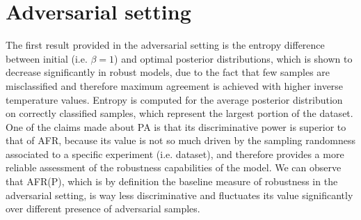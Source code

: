 \section{Adversarial setting}\label{sec:appendix_results_adversarial}

The first result provided in the adversarial setting is the entropy difference
between initial (i.e. $\beta=1$) and optimal posterior distributions, which is shown
to decrease significantly in robust models, due to the fact that few samples
are misclassified and therefore maximum agreement is achieved with higher
inverse temperature values. Entropy is computed for the average posterior distribution
on correctly classified samples, which represent the largest portion of the dataset. \\

One of the claims made about PA is that its discriminative power is superior to that
of AFR, because its value is not so much driven by the sampling randomness associated
to a specific experiment (i.e. dataset), and therefore provides a more reliable
assessment of the robustness capabilities of the model. We can observe that AFR(P),
which is by definition the baseline measure of robustness in the adversarial setting,
is way less discriminative and fluctuates its value significantly over different
presence of adversarial samples.

